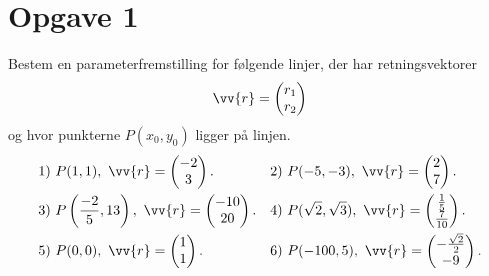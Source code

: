 \section*{Opgave 1}
Bestem en parameterfremstilling for følgende linjer, der har retningsvektorer $$\vv{r} = \begin{pmatrix}
r_1 \\ r_2
\end{pmatrix}$$ og hvor punkterne $P(x_0,y_0)$ ligger på linjen.
\begin{align*}
&1) \ P(1,1), \ \vv{r} = \begin{pmatrix}
-2 \\ 3
\end{pmatrix}.   &&2) \ P(-5,-3), \ \vv{r} = \begin{pmatrix}
2 \\ 7
\end{pmatrix}.    \\
&3) \ P\left(\frac{-2}{5},13\right), \ \vv{r} = \begin{pmatrix}
-10 \\ 20
\end{pmatrix}.   &&4) \ P(\sqrt{2},\sqrt{3}), \ \vv{r} = \begin{pmatrix}
\frac{1}{5} \\ \frac{7}{10}
\end{pmatrix}.   \\
&5) \ P(0,0), \ \vv{r} = \begin{pmatrix}
1 \\ 1
\end{pmatrix}.   &&6) \ P(-100,5), \ \vv{r} = \begin{pmatrix}
-\frac{\sqrt{2}}{2} \\ -9
\end{pmatrix}.   \\
\end{align*}

